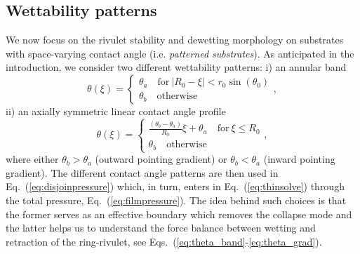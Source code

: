 \documentclass[twoside,twocolumn,9pt]{article}
\begin{document}
\subsection{Wettability patterns}\label{subsec:wettability}
We now focus on the rivulet stability and dewetting morphology on substrates with space-varying contact angle (i.e. {\it patterned substrates}).
As anticipated in the introduction, we consider two different wettability patterns: i) an annular band 
\begin{equation}\label{eq:theta_band}
    \theta(\xi) =\begin{cases}
        \theta_a \quad \text{for}~|R_0-\xi| < r_0\sin(\theta_0) \\
        \theta_b\quad \text{otherwise}
    \end{cases},
\end{equation}
ii) an axially symmetric linear contact angle profile
\begin{equation}\label{eq:theta_grad}
    \theta(\xi) =\begin{cases}
        \frac{(\theta_{b}-\theta_{a})}{R_0} \xi + \theta_{a} \quad \text{for}~\xi \leq R_0 \\
        \theta_b \quad \text{otherwise}
    \end{cases},
\end{equation}
where either $\theta_{b} > \theta_{a}$ (outward pointing gradient) or $\theta_b < \theta_a$ (inward pointing gradient).
The different contact angle patterns are then used in Eq.~(\ref{eq:disjoinpressure}) which, in turn, enters in Eq.~(\ref{eq:thinsolve}) through the total pressure, Eq.~(\ref{eq:filmpressure}).
The idea behind such choices is that the former serves as an effective boundary which removes the collapse mode and the latter helps us to understand the force balance between wetting and retraction of the ring-rivulet, see Eqs.~(\ref{eq:theta_band}-\ref{eq:theta_grad}).
\end{document}
